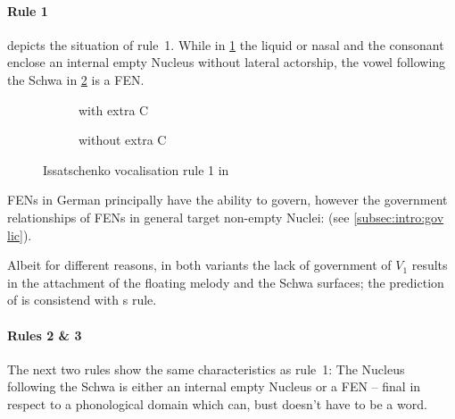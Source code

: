 \paragraph{Rule 1}
depicts the situation of rule~1.
While in \ref{fig:issatschenko voc rule 1:L C end}
the liquid or nasal and the consonant enclose an
internal empty Nucleus without lateral actorship,
the vowel following the Schwa in
\ref{fig:issatschenko voc rule 1:L end}
is a \gls{FEN}.

\begin{figure}[h]
  \centering
  \begin{subfigure}{.49\textwidth}
    \centering
    \begin{structure}
      \V[floating]{\textschwa}
      \emptyV
      \fen
    \end{structure}
    \caption{with extra C}
    \label{fig:issatschenko voc rule 1:L C end}
  \end{subfigure}
  \hfill
  \begin{subfigure}{.49\textwidth}
    \centering
    \begin{structure}
      \V[floating]{\textschwa}
      \fen
    \end{structure}
    \caption{without extra C}
    \label{fig:issatschenko voc rule 1:L end}
  \end{subfigure}
  \caption{Issatschenko vocalisation rule 1 in \CVCV}
  \label{fig:issatschenko voc rule 1}
\end{figure}

\Glspl{FEN} in German principally have the ability
to govern, however the government relationships of
\glspl{FEN} in general  target
non-empty Nuclei:
 (see \cref{subsec:intro:gov lic}).

Albeit for different reasons, in both variants
the lack of government of $V_1$ results in the
attachment of the floating melody and the Schwa
surfaces; the prediction of \CVCV is consistend with
\citeauthor{issatschenko1974}s rule.

\paragraph{Rules 2 \& 3}
The next two rules show the same characteristics
as rule~1: The Nucleus following the Schwa is either
an internal empty Nucleus or a \gls{FEN}
-- final in respect to a phonological domain
which can, bust doesn't have to be a word.

